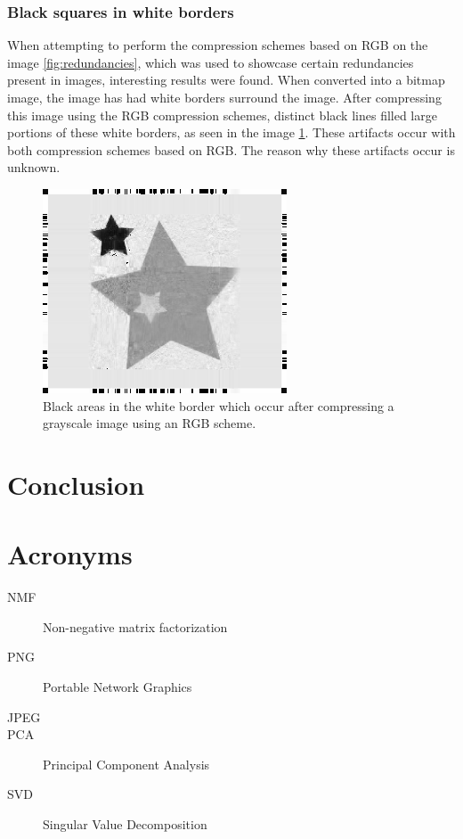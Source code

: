 \documentclass[thesis=M,english]{FITthesis}[2012/10/20]
\begin{document}
\subsection{Black squares in white borders}
When attempting to perform the compression schemes based on RGB on the image
\ref{fig:redundancies}, which was used to showcase certain redundancies present
in images, interesting results were found. When converted into a bitmap image,
the image has had white borders surround the image. After compressing this image
using the RGB compression schemes, distinct black lines filled large portions of these
white borders, as seen in the image \ref{fig:blacksquares}. These artifacts occur with
both compression schemes based on RGB. The reason why these artifacts occur is unknown.

\begin{figure}[h]
  \centering
  \includegraphics[scale=0.65]{imgs/redundancies_black_border}
  \caption{Black areas in the white border which occur after compressing a grayscale image
  		  using an RGB scheme.}
  \label{fig:blacksquares}
\end{figure}

\chapter{Conclusion}





\appendix

\chapter{Acronyms}
\begin{description}
  \item[NMF] Non-negative matrix factorization
  \item[PNG] Portable Network Graphics
  \item[JPEG]
  \item[PCA] Principal Component Analysis
  \item[SVD] Singular Value Decomposition
\end{description}
\end{document}
